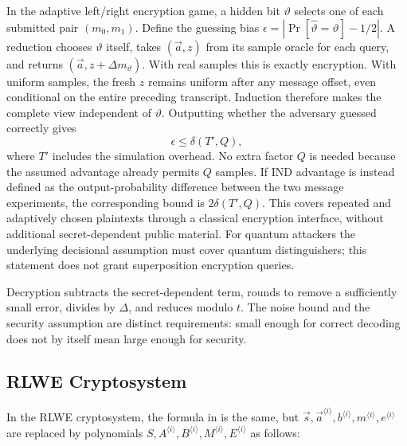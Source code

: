 In the adaptive left/right encryption game, a hidden bit $\vartheta$ selects one of each submitted pair $(m_0,m_1)$. Define the guessing bias $\epsilon=|\Pr[\widehat\vartheta=\vartheta]-1/2|$. A reduction chooses $\vartheta$ itself, takes $(\vec a,z)$ from its sample oracle for each query, and returns $(\vec a,z+\Delta m_\vartheta)$. With real samples this is exactly encryption. With uniform samples, the fresh $z$ remains uniform after any message offset, even conditional on the entire preceding transcript. Induction therefore makes the complete view independent of $\vartheta$. Outputting whether the adversary guessed correctly gives
\[
\epsilon\le\delta(T',Q),
\]
where $T'$ includes the simulation overhead. No extra factor $Q$ is needed because the assumed advantage already permits $Q$ samples. If IND advantage is instead defined as the output-probability difference between the two message experiments, the corresponding bound is $2\delta(T',Q)$. This covers repeated and adaptively chosen plaintexts through a classical encryption interface, without additional secret-dependent public material. For quantum attackers the underlying decisional assumption must cover quantum distinguishers; this statement does not grant superposition encryption queries.

Decryption subtracts the secret-dependent term, rounds to remove a sufficiently small error, divides by $\Delta$, and reduces modulo $t$. The noise bound and the security assumption are distinct requirements: small enough for correct decoding does not by itself mean large enough for security.

\subsection{RLWE Cryptosystem}
\label{subsec:lattice-scheme2}

In the RLWE cryptosystem, the formula in \tboxlabel{\ref*{subsec:lattice-scheme}} is the same, but $\vec{s}, \vec{a}^{\langle i \rangle}, b^{\langle i \rangle}, m^{\langle i \rangle}, e^{\langle i \rangle}$ are replaced by polynomials $S, A^{\langle i \rangle}, B^{\langle i \rangle}, M^{\langle i \rangle}, E^{\langle i \rangle}$ as follows:

